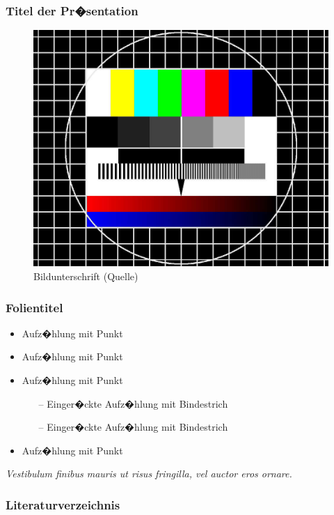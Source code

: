 \documentclass[handout]{beamer}
\begin{document}
	
\begin{frame}
	\frametitle{Titel der Pr�sentation}  
	\vspace{1cm}
	\begin{figure}
		\centering
		\includegraphics[width=0.6\linewidth]{bilder/testbild}
		\caption*{Bildunterschrift (Quelle)}
		\label{fig:testbild}
	\end{figure}
 \end{frame}

\begin{frame}
	\frametitle{Folientitel}
	
		\begin{itemize}
		\item Aufz�hlung mit Punkt
		\item Aufz�hlung mit Punkt
		\item Aufz�hlung mit Punkt
		\begin{itemize}
			\item [--] Einger�ckte Aufz�hlung mit Bindestrich
			\item [--] Einger�ckte Aufz�hlung mit Bindestrich
		\end{itemize}	
		\item Aufz�hlung mit Punkt
	\end{itemize}
\end{frame}

\begin{frame}
	
	\glqq\textit{Vestibulum finibus mauris ut risus fringilla, vel auctor eros ornare.}\grqq\ 
	\autocites[S. 5]{baurSaechtlingKunststoffTaschenbuch2013}
	
	
\end{frame}

\begin{frame}
\frametitle{Literaturverzeichnis}
	\printbibliography
\end{frame}




	
\end{document}
